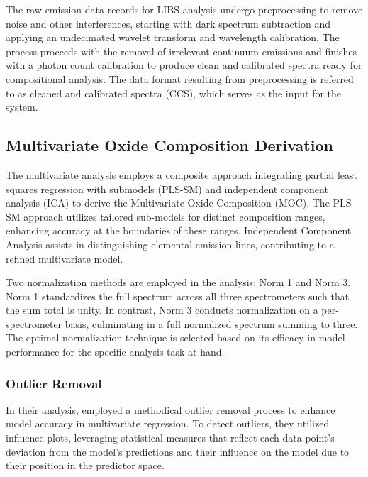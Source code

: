 The raw emission data records for LIBS analysis undergo preprocessing to remove noise and other interferences, starting with dark spectrum subtraction and applying an undecimated wavelet transform and wavelength calibration.
The process proceeds with the removal of irrelevant continuum emissions and finishes with a photon count calibration to produce clean and calibrated spectra ready for compositional analysis.
The data format resulting from preprocessing is referred to as cleaned and calibrated spectra (CCS), which serves as the input for the system.


\subsection{Multivariate Oxide Composition Derivation}\label{sec:moc_derivation}

The multivariate analysis employs a composite approach integrating partial least squares regression with submodels (PLS-SM) and independent component analysis (ICA) to derive the Multivariate Oxide Composition (MOC).
The PLS-SM approach utilizes tailored sub-models for distinct composition ranges, enhancing accuracy at the boundaries of these ranges.
Independent Component Analysis assists in distinguishing elemental emission lines, contributing to a refined multivariate model.

Two normalization methods are employed in the analysis: Norm 1 and Norm 3.
Norm 1 standardizes the full spectrum across all three spectrometers such that the sum total is unity.
In contrast, Norm 3 conducts normalization on a per-spectrometer basis, culminating in a full normalized spectrum summing to three.
The optimal normalization technique is selected based on its efficacy in model performance for the specific analysis task at hand.

\subsubsection{Outlier Removal}\label{sec:outlier_removal}

In their analysis, \citet{andersonImprovedAccuracyQuantitative2017} employed a methodical outlier removal process to enhance model accuracy in multivariate regression. To detect outliers, they utilized influence plots, leveraging statistical measures that reflect each data point's deviation from the model's predictions and their influence on the model due to their position in the predictor space.

